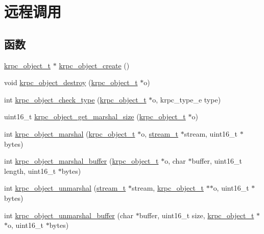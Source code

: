 \hypertarget{group__rpc}{}\section{远程调用}
\label{group__rpc}
\subsection*{函数}
\begin{DoxyCompactItemize}
\item 
\hyperlink{struct__krpc__object__t}{krpc\+\_\+object\+\_\+t} $\ast$ \hyperlink{group__rpc_ga6aad58d8460944596e39822181bf4848}{krpc\+\_\+object\+\_\+create} ()
\item 
void \hyperlink{group__rpc_ga8bb578f8ba5a8de682a1fe2a4c8a20f6}{krpc\+\_\+object\+\_\+destroy} (\hyperlink{struct__krpc__object__t}{krpc\+\_\+object\+\_\+t} $\ast$o)
\item 
int \hyperlink{group__rpc_ga207aac182f9f86e96ddea230ee9c8f61}{krpc\+\_\+object\+\_\+check\+\_\+type} (\hyperlink{struct__krpc__object__t}{krpc\+\_\+object\+\_\+t} $\ast$o, krpc\+\_\+type\+\_\+e type)
\item 
uint16\+\_\+t \hyperlink{group__rpc_gad51ebf7392be0ee1fd9597aa22a43015}{krpc\+\_\+object\+\_\+get\+\_\+marshal\+\_\+size} (\hyperlink{struct__krpc__object__t}{krpc\+\_\+object\+\_\+t} $\ast$o)
\item 
int \hyperlink{group__rpc_ga88e197e67ba6e7dc4b6fa361db77376b}{krpc\+\_\+object\+\_\+marshal} (\hyperlink{struct__krpc__object__t}{krpc\+\_\+object\+\_\+t} $\ast$o, \hyperlink{struct__stream__t}{stream\+\_\+t} $\ast$stream, uint16\+\_\+t $\ast$bytes)
\item 
int \hyperlink{group__rpc_ga32ed12c4faa68e258582b239b46fd180}{krpc\+\_\+object\+\_\+marshal\+\_\+buffer} (\hyperlink{struct__krpc__object__t}{krpc\+\_\+object\+\_\+t} $\ast$o, char $\ast$buffer, uint16\+\_\+t length, uint16\+\_\+t $\ast$bytes)
\item 
int \hyperlink{group__rpc_gaff1ec30de69047da0315283957d877ca}{krpc\+\_\+object\+\_\+unmarshal} (\hyperlink{struct__stream__t}{stream\+\_\+t} $\ast$stream, \hyperlink{struct__krpc__object__t}{krpc\+\_\+object\+\_\+t} $\ast$$\ast$o, uint16\+\_\+t $\ast$bytes)
\item 
int \hyperlink{group__rpc_ga0f2289e356949bc9ae0e8e0a151e42f4}{krpc\+\_\+object\+\_\+unmarshal\+\_\+buffer} (char $\ast$buffer, uint16\+\_\+t size, \hyperlink{struct__krpc__object__t}{krpc\+\_\+object\+\_\+t} $\ast$$\ast$o, uint16\+\_\+t $\ast$bytes)
\item 

\end{DoxyCompactItemize}
